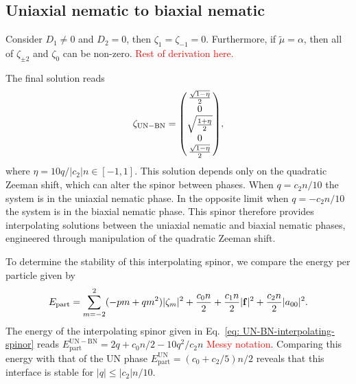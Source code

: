 \subsection{Uniaxial nematic to biaxial nematic}
Consider \(D_1 \neq 0\) and \(D_2 = 0\), then \(\zeta_1 = \zeta_{-1} = 0\).
Furthermore, if \(\tilde{\mu} = \alpha \), then all of \(\zeta_{\pm 2}\) and
\(\zeta_0\) can be non-zero.
\textcolor{red}{Rest of derivation here.}

The final solution reads
\begin{equation}\label{eq: UN-BN-interpolating-spinor}
    \zeta_\mathrm{UN-BN} = \mqty(
    \frac{\sqrt{1 - \eta}}{2} \\
    0 \\
    \sqrt{\frac{1 + \eta}{2}} \\
    0 \\
    \frac{\sqrt{1 - \eta}}{2}
    ),
\end{equation}
where \(\eta = 10q /|c_2|n \in [-1, 1]\).
This solution depends only on the quadratic Zeeman shift, which can alter the
spinor between phases.
When \(q = c_2n / 10\) the system is in the uniaxial nematic phase.
In the opposite limit when \(q = -c_2n/10\) the system is in the biaxial
nematic phase.
This spinor therefore provides interpolating solutions between the uniaxial
nematic and biaxial nematic phases, engineered through manipulation of the
quadratic Zeeman shift.

To determine the stability of this interpolating spinor, we compare the energy
per particle given by~\cite{Kawaguchi2012}
\begin{equation}
    E_\mathrm{part} = \sum_{m=-2}^{2}(-pm + qm^2)|\zeta_m|^2 + \frac{c_0n}{2}
    + \frac{c_1n}{2}|\vb{f}|^2 + \frac{c_2n}{2}|a_{00}|^2.
\end{equation}
The energy of the interpolating spinor given in
Eq.~\eqref{eq: UN-BN-interpolating-spinor} reads
\(E^\mathrm{UN-BN}_\mathrm{part} = 2q + c_0n/2 - 10q^2/c_2n\)
\textcolor{red}{Messy notation}.
Comparing this energy with that of the UN phase
\(E^\mathrm{UN}_\mathrm{part} = (c_0+c_2/5)n/2\) reveals that this interface is
stable for \(|q| \leq |c_2|n/10\).

